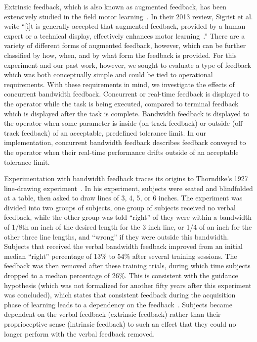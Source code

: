 \documentclass{paper}
\begin{document}
Extrinsic feedback, which is also known as augmented feedback, has been extensively studied in the field motor learning~\cite{Sigrist2013}.
In their 2013 review, Sigrist et al. write ``[i]t is generally accepted that augmented feedback, provided by a human expert or a technical display, effectively enhances motor learning~\cite{Sigrist2013}.''
There are a variety of different forms of augmented feedback, however, which can be further classified by how, when, and by what form the feedback is provided.
For this experiment and our past work, however, we sought to evaluate a type of feedback which was both conceptually simple and could be tied to operational requirements.
With these requirements in mind, we investigate the effects of concurrent bandwidth feedback.
Concurrent or real-time feedback is displayed to the operator while the task is being executed, compared to terminal feedback which is displayed after the task is complete.
Bandwidth feedback is displayed to the operator when some parameter is inside (on-track feedback) or outside (off-track feedback) of an acceptable, predefined tolerance limit.
In our implementation, concurrent bandwidth feedback describes feedback conveyed to the operator when their real-time performance drifts outside of an acceptable tolerance limit.

Experimentation with bandwidth feedback traces its origins to Thorndike's 1927 line-drawing experiment~\cite{thorndike1927law}.
In his experiment, subjects were seated and blindfolded at a table, then asked to draw lines of 3, 4, 5, or 6 inches.
The experiment was divided into two groups of subjects, one group of subjects received no verbal feedback, while the other group was told ``right'' of they were within a bandwidth of 1/8th an inch of the desired length for the 3 inch line, or 1/4 of an inch for the other three line lengths, and ``wrong'' if they were outside this bandwidth.
Subjects that received the verbal bandwidth feedback improved from an initial median ``right'' percentage of 13\% to 54\% after several training sessions.
The feedback was then removed after these training trials, during which time subjects dropped to a median percentage of 26\%.
This is consistent with the guidance hypothesis (which was not formalized for another fifty years after this experiment was concluded), which states that consistent feedback during the acquisition phase of learning leads to a dependency on the feedback~\cite{salmoni1984knowledge}.
Subjects became dependent on the verbal feedback (extrinsic feedback) rather than their proprioceptive sense (intrinsic feedback) to such an effect that they could no longer perform with the verbal feedback removed.
\end{document}
